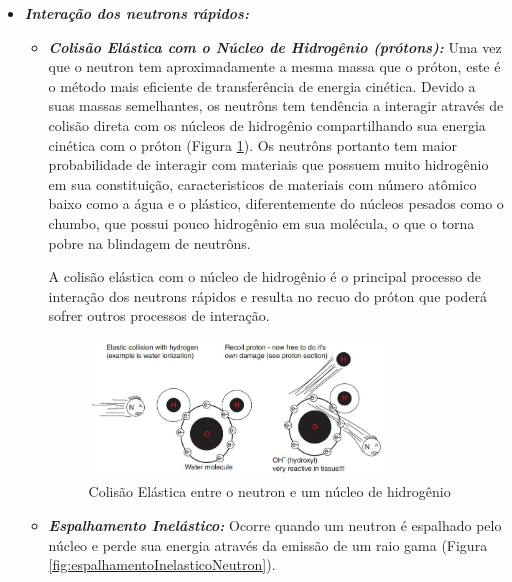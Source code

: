 \documentclass[11pt,a4paper]{article}
\begin{document}
            \begin{itemize}
                \item \textbf{\textit{\textcolor{CarnationPink}{Interação dos neutrons rápidos}:}} 
                
                    \begin{itemize}
                        \item \textbf{\textit{\textcolor{CarnationPink}{Colisão Elástica com o Núcleo de Hidrogênio (prótons)}:}} Uma vez que o neutron tem aproximadamente a mesma massa que o próton, este é o método mais eficiente de transferência de energia cinética. Devido a suas massas semelhantes, os neutrôns tem tendência a interagir através de colisão direta com os núcleos de hidrogênio compartilhando sua energia cinética com o próton (Figura \ref{fig:colisaoElasticaNeutronProton}). Os neutrôns portanto tem maior probabilidade de interagir com materiais que possuem muito hidrogênio em sua constituição, caracteristicos de materiais com número atômico baixo como a água e o plástico, diferentemente do núcleos pesados como o chumbo, que possui pouco hidrogênio em sua molécula, o que o torna pobre na blindagem de neutrôns. 
                        
                        A colisão elástica com o núcleo de hidrogênio é o principal processo de interação dos neutrons rápidos e resulta no recuo do próton que poderá sofrer outros processos de interação. 

                            \begin{figure}[h]
                                \centering
                                \includegraphics[width=0.8\textwidth]{Imagens/colisaoElasticaNeutronProton.JPG}
                                \caption{Colisão Elástica entre o neutron e um núcleo de hidrogênio}
                                \label{fig:colisaoElasticaNeutronProton}                
                            \end{figure}

                        \item \textbf{\textit{\textcolor{CarnationPink}{Espalhamento Inelástico}:}} Ocorre quando um neutron é espalhado pelo núcleo e perde sua energia através da emissão de um raio gama (Figura \ref{fig:espalhamentoInelasticoNeutron}). 
                        

\end{itemize}
\end{itemize}
\end{document}
